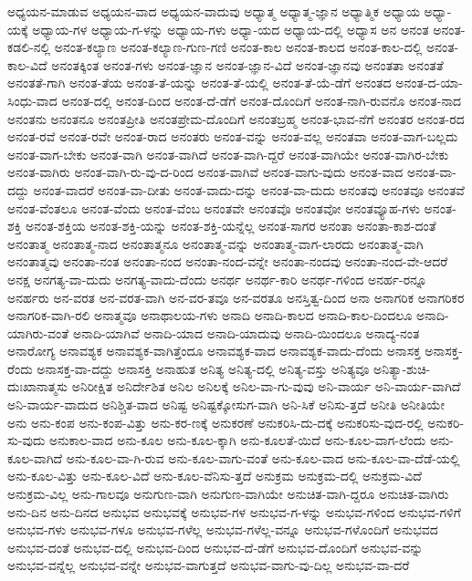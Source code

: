 {ಅಧ್ಯಯನ-ಮಾಡುವ
ಅಧ್ಯಯನ-ವಾದ
ಅಧ್ಯಯನ-ವಾದುವು
ಅಧ್ಯಾತ್ಮ
ಅಧ್ಯಾತ್ಮ-ಜ್ಞಾನ
ಅಧ್ಯಾತ್ಮಿಕ
ಅಧ್ಯಾಯ
ಅಧ್ಯಾ-ಯಕ್ಕೆ
ಅಧ್ಯಾಯ-ಗಳ
ಅಧ್ಯಾಯ-ಗ-ಳನ್ನು
ಅಧ್ಯಾಯ-ಗಳು
ಅಧ್ಯಾ-ಯದ
ಅಧ್ಯಾಯ-ದಲ್ಲಿ
ಅಧ್ಯಾಸ
ಅನ
ಅನಂತ
ಅನಂತ-ಕಡಲಿ-ನಲ್ಲಿ
ಅನಂತ-ಕಲ್ಯಾಣ
ಅನಂತ-ಕಲ್ಯಾಣ-ಗುಣ-ಗಣಿ
ಅನಂತ-ಕಾಲ
ಅನಂತ-ಕಾಲದ
ಅನಂತ-ಕಾಲ-ದಲ್ಲಿ
ಅನಂತ-ಕಾಲ-ವಿದೆ
ಅನಂತಕ್ಕಿಂತ
ಅನಂತ-ಗಳು
ಅನಂತ-ಜ್ಞಾನ
ಅನಂತ-ಜ್ಞಾನ-ವಿದೆ
ಅನಂತ-ಜ್ಞಾನವು
ಅನಂತತಾ
ಅನಂತತೆ
ಅನಂತತೆ-ಗಾಗಿ
ಅನಂತ-ತೆಯ
ಅನಂತ-ತೆ-ಯನ್ನು
ಅನಂತ-ತೆ-ಯಲ್ಲಿ
ಅನಂತ-ತೆ-ಯೆ-ಡೆಗೆ
ಅನಂತದ
ಅನಂತ-ದ-ಯಾ-ಸಿಂಧು-ವಾದ
ಅನಂತ-ದಲ್ಲಿ
ಅನಂತ-ದಿಂದ
ಅನಂತ-ದೆ-ಡೆಗೆ
ಅನಂತ-ದೊಂದಿಗೆ
ಅನಂತ-ನಾಗಿ-ರುವನೊ
ಅನಂತ-ನಾದ
ಅನಂತನು
ಅನಂತನೂ
ಅನಂತಪ್ರೀತಿ
ಅನಂತಪ್ರೇಮ-ದೊಂದಿಗೆ
ಅನಂತಬ್ರಹ್ಮ
ಅನಂತ-ಭಾವ-ನೆಗೆ
ಅನಂತರ
ಅನಂತ-ರದ
ಅನಂತ-ರವೆ
ಅನಂತ-ರವೇ
ಅನಂತ-ರಾದ
ಅನಂತರು
ಅನಂತ-ವನ್ನು
ಅನಂತ-ವಲ್ಲ
ಅನಂತವಾ
ಅನಂತ-ವಾಗ-ಬಲ್ಲದು
ಅನಂತ-ವಾಗ-ಬೇಕು
ಅನಂತ-ವಾಗಿ
ಅನಂತ-ವಾಗಿದೆ
ಅನಂತ-ವಾಗಿ-ದ್ದರೆ
ಅನಂತ-ವಾಗಿಯೇ
ಅನಂತ-ವಾಗಿರ-ಬೇಕು
ಅನಂತ-ವಾಗಿರು
ಅನಂತ-ವಾಗಿ-ರು-ವು-ದ-ರಿಂದ
ಅನಂತ-ವಾಗಿವೆ
ಅನಂತ-ವಾಗು-ವುದು
ಅನಂತ-ವಾದ
ಅನಂತ-ವಾ-ದದ್ದು
ಅನಂತ-ವಾದರೆ
ಅನಂತ-ವಾ-ದೀತು
ಅನಂತ-ವಾದು-ದನ್ನು
ಅನಂತ-ವಾ-ದುದು
ಅನಂತವು
ಅನಂತವೂ
ಅನಂತವೆ
ಅನಂತ-ವೆಂತಲೂ
ಅನಂತ-ವೆಂದು
ಅನಂತ-ವೆಂಬ
ಅನಂತವೇ
ಅನಂತವೊ
ಅನಂತವೋ
ಅನಂತವ್ಯೂಹ-ಗಳು
ಅನಂತ-ಶಕ್ತಿ
ಅನಂತ-ಶಕ್ತಿಯ
ಅನಂತ-ಶಕ್ತಿ-ಯನ್ನು
ಅನಂತ-ಶಕ್ತಿ-ಯನ್ನೆಲ್ಲ
ಅನಂತ-ಸಾಗರ
ಅನಂತಾ
ಅನಂತಾ-ಕಾಶ-ದಂತೆ
ಅನಂತಾತ್ಮ
ಅನಂತಾತ್ಮ-ನಾದ
ಅನಂತಾತ್ಮನೂ
ಅನಂತಾತ್ಮ-ವನ್ನು
ಅನಂತಾತ್ಮ-ವಾಗ-ಲಾರದು
ಅನಂತಾತ್ಮ-ವಾಗಿ
ಅನಂತಾತ್ಮವು
ಅನಂತಾ-ನಂತ
ಅನಂತಾ-ನಂದ
ಅನಂತಾ-ನಂದ-ವನ್ನೇ
ಅನಂತಾ-ನಂದವು
ಅನಂತಾ-ನಂದ-ವೇ-ಆದರೆ
ಅನಕ್ಷ
ಅನಗತ್ಯ-ವಾ-ದುದು
ಅನಗತ್ಯ-ವಾದು-ದೆಂದು
ಅನರ್ಥ
ಅನರ್ಥ-ಕಾರಿ
ಅನರ್ಥ-ಗಳಿಂದ
ಅನರ್ಹ-ರನ್ನೂ
ಅನರ್ಹರು
ಅನ-ವರತ
ಅನ-ವರತ-ವಾಗಿ
ಅನ-ವರ-ತವೂ
ಅನ-ವರತೂ
ಅನಸ್ತಿತ್ವ-ದಿಂದ
ಅನಾ
ಅನಾಗರಿಕ
ಅನಾಗರಿಕರ
ಅನಾಗರಿಕ-ವಾಗಿ-ರಲಿ
ಅನಾತ್ಮವೂ
ಅನಾಥಾಲಯ-ಗಳು
ಅನಾದಿ
ಅನಾದಿ-ಕಾಲದ
ಅನಾದಿ-ಕಾಲ-ದಿಂದಲೂ
ಅನಾದಿ-ಯಾಗಿರು-ವಂತೆ
ಅನಾದಿ-ಯಾಗಿವೆ
ಅನಾದಿ-ಯಾದ
ಅನಾದಿ-ಯಾದುವು
ಅನಾದಿ-ಯಿಂದಲೂ
ಅನಾದ್ಯ-ನಂತ
ಅನಾರೋಗ್ಯ
ಅನಾವಶ್ಯಕ
ಅನಾವಶ್ಯಕ-ವಾಗಿತ್ತೆಂದೂ
ಅನಾವಶ್ಯಕ-ವಾದ
ಅನಾವಶ್ಯಕ-ವಾದು-ದೆಂದು
ಅನಾಸಕ್ತ
ಅನಾಸಕ್ತ-ರೆಂದು
ಅನಾಸಕ್ತ-ವಾ-ದದ್ದು
ಅನಾಸಕ್ತಿ
ಅನಾಹುತ
ಅನಿತ್ಯ
ಅನಿತ್ಯ-ದಲ್ಲಿ
ಅನಿತ್ಯ-ವಸ್ತು
ಅನಿತ್ಯವೂ
ಅನಿತ್ಯಾ-ಶುಚಿ-ದುಃಖಾನಾತ್ಮಸು
ಅನಿರೀಕ್ಷಿತ
ಅನಿರ್ದೇಶಿತ
ಅನಿಲ
ಅನಿಲಕ್ಕೆ
ಅನಿಲ-ವಾ-ಗು-ವುವು
ಅನಿ-ವಾರ್ಯ
ಅನಿ-ವಾರ್ಯ-ವಾಗಿದೆ
ಅನಿ-ವಾರ್ಯ-ವಾದುದ
ಅನಿಶ್ಚಿತ-ವಾದ
ಅನಿಷ್ಟ
ಅನಿಷ್ಟಕ್ಕೋಸುಗ-ವಾಗಿ
ಅನಿ-ಸಿಕೆ
ಅನಿಸು-ತ್ತದೆ
ಅನೀತಿ
ಅನೀತಿಯೇ
ಅನು
ಅನು-ಕಂಪ
ಅನು-ಕಂಪ-ವಿತ್ತು
ಅನು-ಕರ-ಣಕ್ಕೆ
ಅನುಕರಣೆ
ಅನುಕರಿಸಿ-ದು-ದಕ್ಕೆ
ಅನುಕರಿಸು-ವುದ-ರಲ್ಲಿ
ಅನುಕರಿ-ಸು-ವುದು
ಅನುಕಾಲ-ವಾದ
ಅನು-ಕೂಲ
ಅನು-ಕೂಲ-ಕ್ಕಾಗಿ
ಅನು-ಕೂಲತೆ-ಯಿದೆ
ಅನು-ಕೂಲ-ವಾಗ-ಲೆಂದು
ಅನು-ಕೂಲ-ವಾಗಿದೆ
ಅನು-ಕೂಲ-ವಾ-ಗಿ-ರುವ
ಅನು-ಕೂಲ-ವಾಗು-ವಂತೆ
ಅನು-ಕೂಲ-ವಾದ
ಅನು-ಕೂಲ-ವಾ-ದೆಡೆ-ಯಲ್ಲಿ
ಅನು-ಕೂಲ-ವಿತ್ತು
ಅನು-ಕೂಲ-ವಿದೆ
ಅನು-ಕೂಲ-ವೆನಿಸು-ತ್ತದೆ
ಅನುಕ್ರಮ
ಅನುಕ್ರಮ-ದಲ್ಲಿ
ಅನುಕ್ರಮ-ವಿದೆ
ಅನುಕ್ರಮ-ವಿಲ್ಲ
ಅನು-ಗಾಲವೂ
ಅನುಗುಣ-ವಾಗಿ
ಅನುಗುಣ-ವಾಗಿಯೇ
ಅನುಚಿತ-ವಾಗಿ-ದ್ದರೂ
ಅನುಚಿತ-ವಾಗಿರು
ಅನು-ದಿನ
ಅನು-ದಿನದ
ಅನುಭವ
ಅನುಭವಕ್ಕೆ
ಅನುಭವ-ಗಳ
ಅನುಭವ-ಗ-ಳನ್ನು
ಅನುಭವ-ಗಳಿಂದ
ಅನುಭವ-ಗಳಿಗೆ
ಅನುಭವ-ಗಳು
ಅನುಭವ-ಗಳೂ
ಅನುಭವ-ಗಳೆಲ್ಲ
ಅನುಭವ-ಗಳೆಲ್ಲ-ವನ್ನೂ
ಅನುಭವ-ಗಳೊಂದಿಗೆ
ಅನುಭವದ
ಅನುಭವ-ದಂತೆ
ಅನುಭವ-ದಲ್ಲಿ
ಅನುಭವ-ದಿಂದ
ಅನುಭವ-ದೆ-ಡೆಗೆ
ಅನುಭವ-ದೊಂದಿಗೆ
ಅನುಭವ-ವನ್ನು
ಅನುಭವ-ವನ್ನೆಲ್ಲ
ಅನುಭವ-ವನ್ನೇ
ಅನುಭವ-ವಾಗುತ್ತದೆ
ಅನುಭವ-ವಾಗು-ವು-ದಿಲ್ಲ
ಅನುಭವ-ವಾ-ದರೆ
}
